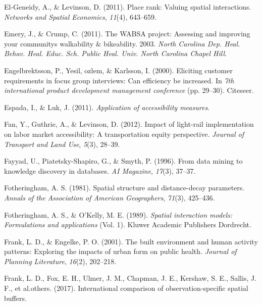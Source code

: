 \documentclass[
11pt, %
oneside, %
english, %
singlespacing, %
]{macthesis} %
\newlength{\cslhangindent}
\newenvironment{CSLReferences}[2] %
 {%
  \setlength{\parindent}{0pt}
  \ifodd #1 \everypar{\setlength{\hangindent}{\cslhangindent}}\ignorespaces\fi
  \ifnum #2 > 0
  \setlength{\parskip}{#2\baselineskip}
  \fi
 }%
 {}
\begin{document}
\begin{CSLReferences}{1}{0}
\leavevmode{}%
El-Geneidy, A., \& Levinson, D. (2011). Place rank: Valuing spatial interactions. \emph{Networks and Spatial Economics}, \emph{11}(4), 643--659.

\leavevmode{}%
Emery, J., \& Crump, C. (2011). The WABSA project: Assessing and improving your communitys walkability \& bikeability. 2003. \emph{North Carolina Dep. Heal. Behav. Heal. Educ. Sch. Public Heal. Univ. North Carolina Chapel Hill}.

\leavevmode{}%
Engelbrektsson, P., Yesil, ozlem, \& Karlsson, I. (2000). Eliciting customer requirements in focus group interviews: Can efficiency be increased. In \emph{7th international product development management conference} (pp. 29--30). Citeseer.

\leavevmode{}%
Espada, I., \& Luk, J. (2011). \emph{Application of accessibility measures}.

\leavevmode{}%
Fan, Y., Guthrie, A., \& Levinson, D. (2012). Impact of light-rail implementation on labor market accessibility: A transportation equity perspective. \emph{Journal of Transport and Land Use}, \emph{5}(3), 28--39.

\leavevmode{}%
Fayyad, U., Piatetsky-Shapiro, G., \& Smyth, P. (1996). From data mining to knowledge discovery in databases. \emph{AI Magazine}, \emph{17}(3), 37--37.

\leavevmode{}%
Fotheringham, A. S. (1981). Spatial structure and distance-decay parameters. \emph{Annals of the Association of American Geographers}, \emph{71}(3), 425--436.

\leavevmode{}%
Fotheringham, A. S., \& O'Kelly, M. E. (1989). \emph{Spatial interaction models: Formulations and applications} (Vol. 1). Kluwer Academic Publishers Dordrecht.

\leavevmode{}%
Frank, L. D., \& Engelke, P. O. (2001). The built environment and human activity patterns: Exploring the impacts of urban form on public health. \emph{Journal of Planning Literature}, \emph{16}(2), 202--218.

\leavevmode{}%
Frank, L. D., Fox, E. H., Ulmer, J. M., Chapman, J. E., Kershaw, S. E., Sallis, J. F., et al.others. (2017). International comparison of observation-specific spatial buffers.


\end{CSLReferences}
\end{document}

